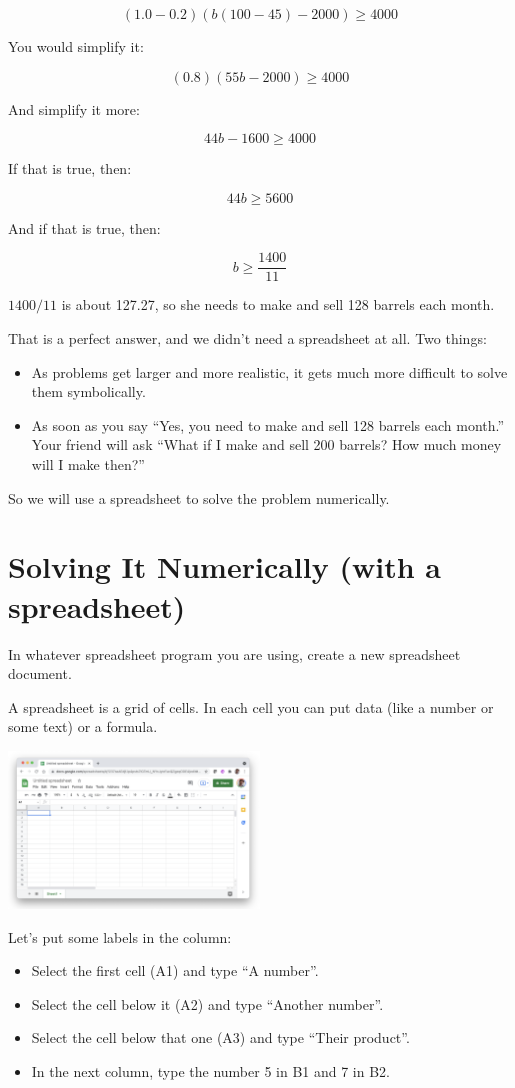 $$(1.0 - 0.2)\left(b(100 - 45) - 2000\right) \geq 4000$$

You would simplify it:

$$(0.8)\left(55 b - 2000\right) \geq 4000$$

And simplify it more:

$$44b - 1600 \geq 4000$$

If that is true, then:

$$44b \geq 5600$$

And if that is true, then:

$$b \geq \frac{1400}{11}$$

$1400/11$ is about 127.27, so she needs to make and sell 128 barrels
each month.

That is a perfect answer, and we didn't need a spreadsheet at all. Two things:
\begin{itemize}
\item As problems get larger and more realistic, it gets much more difficult to solve them symbolically.
\item As soon as you say ``Yes, you need to make and sell 128 barrels
  each month.'' Your friend will ask ``What if I make and sell 200
  barrels? How much money will I make then?''
\end{itemize}

So we will use a spreadsheet to solve the problem numerically.

\section{Solving It Numerically (with a spreadsheet)}

In whatever spreadsheet program you are using, create a new spreadsheet document.

A spreadsheet is a grid of cells.  In each cell you can put data (like a number or some text) or a formula.

\includegraphics[width=0.5\textwidth]{BlankSheet.png}

Let's put some labels in the column:
\begin{itemize}
\item Select the first cell (A1) and type ``A number''.
\item Select the cell below it (A2) and type ``Another number''.
\item Select the cell below that one (A3) and type ``Their product''.
\item In the next column, type the number 5 in B1 and 7 in B2.
\end{itemize}

